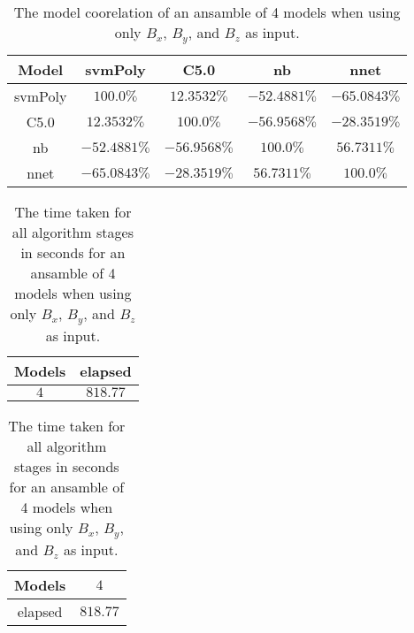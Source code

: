 \begin{table}[!ht]
	\centering
	\begin{tabular}{|c|c|c|c|c|}
		\hline
		Model & svmPoly & C5.0 & nb & nnet \\ \hline
		svmPoly & $100.0\%$ & $12.3532\%$ & $-52.4881\%$ & $-65.0843\%$ \\ \hline
		C5.0 & $12.3532\%$ & $100.0\%$ & $-56.9568\%$ & $-28.3519\%$ \\ \hline
		nb & $-52.4881\%$ & $-56.9568\%$ & $100.0\%$ & $56.7311\%$ \\ \hline
		nnet & $-65.0843\%$ & $-28.3519\%$ & $56.7311\%$ & $100.0\%$ \\ \hline
	\end{tabular}
	\caption{The model coorelation of an ansamble of 4 models when using only $B_{x}$, $B_{y}$, and $B_{z}$ as input.}
	\label{tab:ansamble4:coord}
\end{table}

\begin{table}[!ht]
	\centering
	\begin{tabular}{|c|c|}
		\hline
		Models & elapsed \\ \hline
		$4$ & $818.77$ \\ \hline
	\end{tabular}
	\caption{The time taken for all algorithm stages in seconds for an ansamble of 4 models when using only $B_{x}$, $B_{y}$, and $B_{z}$ as input.}
	\label{tab:time:ansamble:coord:4}
\end{table}

\begin{table}[!ht]
	\centering
	\begin{tabular}{|c|c|}
		\hline
		Models & $4$ \\ \hline
		elapsed & $818.77$ \\ \hline
	\end{tabular}
	\caption{The time taken for all algorithm stages in seconds for an ansamble of 4 models when using only $B_{x}$, $B_{y}$, and $B_{z}$ as input.}
	\label{tab:time:ansamble:reverse:coord:4}
\end{table}

